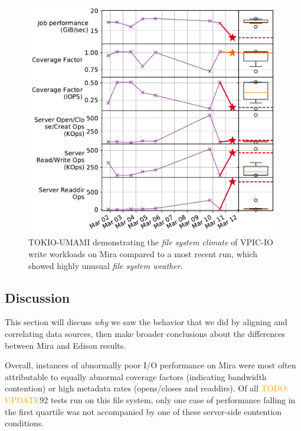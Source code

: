 \documentclass[conference,10pt,compsocconf]{IEEEtran}
\newcommand{\todo}[1]{\textcolor{Orange}{TODO: #1}}
\begin{document}
\begin{figure}[t]
    \centering
    \includegraphics[width=1.0\columnwidth]{figs/umami-mira-fs1-vpic-write.pdf}
    \caption{TOKIO-UMAMI demonstrating the \emph{file system climate} of VPIC-IO write workloads
    on Mira compared to a most recent run, which showed
    highly unusual \emph{file system weather}.}
    \label{fig:umami-mira-fs1-vpic-write}
\end{figure}

\subsection{Discussion} \label{sec:results/discussion}

This section will discuss \emph{why} we saw the behavior that we did by
aligning and correlating data sources, then make broader conclusions about the
differences between Mira and Edison results.

Overall, instances of abnormally poor I/O performance on Mira were most often attributable to equally abnormal coverage factors (indicating bandwidth contention) or high metadata rates (opens/closes and readdirs).  Of all \todo{UPDATE}92 tests run on this file system, only one case of performance falling in the first quartile was not accompanied by one of these server-side contention conditions.
\end{document}
